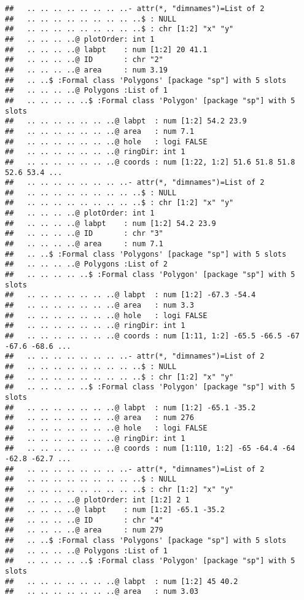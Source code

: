 \documentclass[]{article}
\begin{document}
\begin{verbatim}
##   .. .. .. .. .. .. .. ..- attr(*, "dimnames")=List of 2
##   .. .. .. .. .. .. .. .. ..$ : NULL
##   .. .. .. .. .. .. .. .. ..$ : chr [1:2] "x" "y"
##   .. .. .. ..@ plotOrder: int 1
##   .. .. .. ..@ labpt    : num [1:2] 20 41.1
##   .. .. .. ..@ ID       : chr "2"
##   .. .. .. ..@ area     : num 3.19
##   .. ..$ :Formal class 'Polygons' [package "sp"] with 5 slots
##   .. .. .. ..@ Polygons :List of 1
##   .. .. .. .. ..$ :Formal class 'Polygon' [package "sp"] with 5 slots
##   .. .. .. .. .. .. ..@ labpt  : num [1:2] 54.2 23.9
##   .. .. .. .. .. .. ..@ area   : num 7.1
##   .. .. .. .. .. .. ..@ hole   : logi FALSE
##   .. .. .. .. .. .. ..@ ringDir: int 1
##   .. .. .. .. .. .. ..@ coords : num [1:22, 1:2] 51.6 51.8 51.8 52.6 53.4 ...
##   .. .. .. .. .. .. .. ..- attr(*, "dimnames")=List of 2
##   .. .. .. .. .. .. .. .. ..$ : NULL
##   .. .. .. .. .. .. .. .. ..$ : chr [1:2] "x" "y"
##   .. .. .. ..@ plotOrder: int 1
##   .. .. .. ..@ labpt    : num [1:2] 54.2 23.9
##   .. .. .. ..@ ID       : chr "3"
##   .. .. .. ..@ area     : num 7.1
##   .. ..$ :Formal class 'Polygons' [package "sp"] with 5 slots
##   .. .. .. ..@ Polygons :List of 2
##   .. .. .. .. ..$ :Formal class 'Polygon' [package "sp"] with 5 slots
##   .. .. .. .. .. .. ..@ labpt  : num [1:2] -67.3 -54.4
##   .. .. .. .. .. .. ..@ area   : num 3.3
##   .. .. .. .. .. .. ..@ hole   : logi FALSE
##   .. .. .. .. .. .. ..@ ringDir: int 1
##   .. .. .. .. .. .. ..@ coords : num [1:11, 1:2] -65.5 -66.5 -67 -67.6 -68.6 ...
##   .. .. .. .. .. .. .. ..- attr(*, "dimnames")=List of 2
##   .. .. .. .. .. .. .. .. ..$ : NULL
##   .. .. .. .. .. .. .. .. ..$ : chr [1:2] "x" "y"
##   .. .. .. .. ..$ :Formal class 'Polygon' [package "sp"] with 5 slots
##   .. .. .. .. .. .. ..@ labpt  : num [1:2] -65.1 -35.2
##   .. .. .. .. .. .. ..@ area   : num 276
##   .. .. .. .. .. .. ..@ hole   : logi FALSE
##   .. .. .. .. .. .. ..@ ringDir: int 1
##   .. .. .. .. .. .. ..@ coords : num [1:110, 1:2] -65 -64.4 -64 -62.8 -62.7 ...
##   .. .. .. .. .. .. .. ..- attr(*, "dimnames")=List of 2
##   .. .. .. .. .. .. .. .. ..$ : NULL
##   .. .. .. .. .. .. .. .. ..$ : chr [1:2] "x" "y"
##   .. .. .. ..@ plotOrder: int [1:2] 2 1
##   .. .. .. ..@ labpt    : num [1:2] -65.1 -35.2
##   .. .. .. ..@ ID       : chr "4"
##   .. .. .. ..@ area     : num 279
##   .. ..$ :Formal class 'Polygons' [package "sp"] with 5 slots
##   .. .. .. ..@ Polygons :List of 1
##   .. .. .. .. ..$ :Formal class 'Polygon' [package "sp"] with 5 slots
##   .. .. .. .. .. .. ..@ labpt  : num [1:2] 45 40.2
##   .. .. .. .. .. .. ..@ area   : num 3.03

\end{verbatim}
\end{document}
